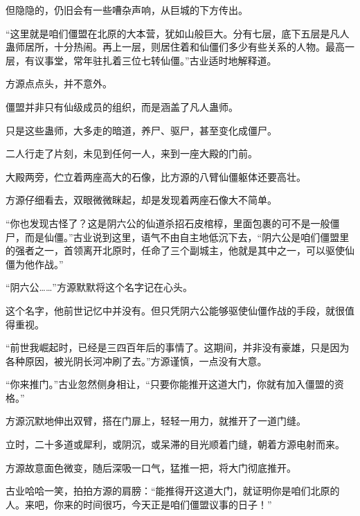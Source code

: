 \begin{this_body}
但隐隐的，仍旧会有一些嘈杂声响，从巨城的下方传出。

“这里就是咱们僵盟在北原的大本营，犹如山般巨大。分有七层，底下五层是凡人蛊师居所，十分热闹。再上一层，则居住着和仙僵们多少有些关系的人物。最高一层，有议事堂，常年驻扎着三位七转仙僵。”古业适时地解释道。

方源点点头，并不意外。

僵盟并非只有仙级成员的组织，而是涵盖了凡人蛊师。

只是这些蛊师，大多走的暗道，养尸、驱尸，甚至变化成僵尸。

二人行走了片刻，未见到任何一人，来到一座大殿的门前。

大殿两旁，伫立着两座高大的石像，比方源的八臂仙僵躯体还要高壮。

方源仔细看去，双眼微微眯起，却是发现着两座石像大不简单。

“你也发现古怪了？这是阴六公的仙道杀招石皮棺椁，里面包裹的可不是一般僵尸，而是仙僵。”古业说到这里，语气不由自主地低沉下去，“阴六公是咱们僵盟里的强者之一，首领离开北原时，任命了三个副城主，他就是其中之一，可以驱使仙僵为他作战。”

“阴六公……”方源默默将这个名字记在心头。

这个名字，他前世记忆中并没有。但只凭阴六公能够驱使仙僵作战的手段，就很值得重视。

“前世我崛起时，已经是三四百年后的事情了。这期间，并非没有豪雄，只是因为各种原因，被光阴长河冲刷了去。”方源谨慎，一点没有大意。

“你来推门。”古业忽然侧身相让，“只要你能推开这道大门，你就有加入僵盟的资格。”

方源沉默地伸出双臂，搭在门扉上，轻轻一用力，就推开了一道门缝。

立时，二十多道或犀利，或阴沉，或呆滞的目光顺着门缝，朝着方源电射而来。

方源故意面色微变，随后深吸一口气，猛推一把，将大门彻底推开。

古业哈哈一笑，拍拍方源的肩膀：“能推得开这道大门，就证明你是咱们北原的人。来吧，你来的时间很巧，今天正是咱们僵盟议事的日子！”

\end{this_body}

